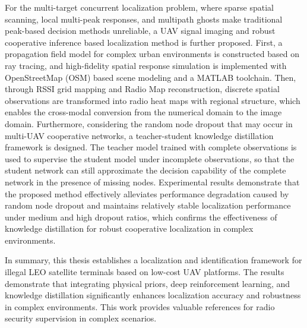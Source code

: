 \begin{enabstract}
For the multi-target concurrent localization problem, where sparse spatial scanning, local multi-peak responses, and multipath ghosts make traditional peak-based decision methods unreliable, a UAV signal imaging and robust cooperative inference based localization method is further proposed. First, a propagation field model for complex urban environments is constructed based on ray tracing, and high-fidelity spatial response simulation is implemented with OpenStreetMap (OSM) based scene modeling and a MATLAB toolchain. Then, through RSSI grid mapping and Radio Map reconstruction, discrete spatial observations are transformed into radio heat maps with regional structure, which enables the cross-modal conversion from the numerical domain to the image domain. Furthermore, considering the random node dropout that may occur in multi-UAV cooperative networks, a teacher-student knowledge distillation framework is designed. The teacher model trained with complete observations is used to supervise the student model under incomplete observations, so that the student network can still approximate the decision capability of the complete network in the presence of missing nodes. Experimental results demonstrate that the proposed method effectively alleviates performance degradation caused by random node dropout and maintains relatively stable localization performance under medium and high dropout ratios, which confirms the effectiveness of knowledge distillation for robust cooperative localization in complex environments.

In summary, this thesis establishes a localization and identification framework for illegal LEO satellite terminals based on low-cost UAV platforms. The results demonstrate that integrating physical priors, deep reinforcement learning, and knowledge distillation significantly enhances localization accuracy and robustness in complex environments. This work provides valuable references for radio security supervision in complex scenarios.

\end{enabstract}